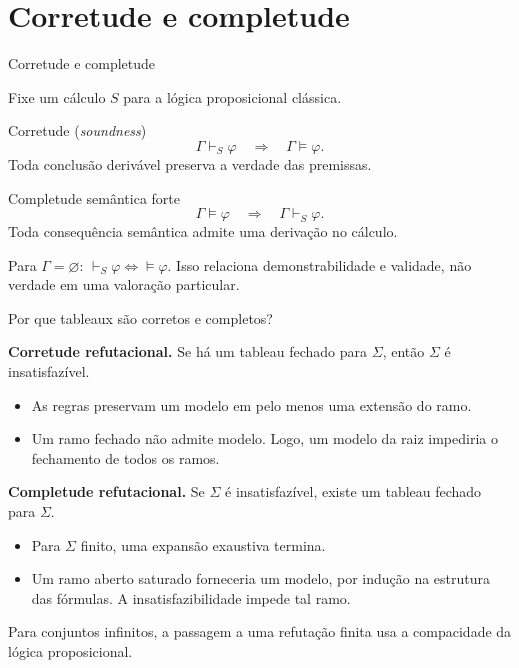\documentclass[10pt,aspectratio=169]{beamer}
\newcommand{\dest}[1]{\alert{#1}}
\begin{document}
\section{Corretude e completude}

\begin{frame}{Corretude e completude}

Fixe um cálculo $S$ para a lógica proposicional clássica.
\begin{block}{Corretude (\textit{soundness})}
\[\Gamma\vdash_S\varphi\quad\Longrightarrow\quad\Gamma\models\varphi.\]
Toda conclusão derivável preserva a verdade das premissas.
\end{block}
\begin{block}{Completude semântica forte}
\[\Gamma\models\varphi\quad\Longrightarrow\quad\Gamma\vdash_S\varphi.\]
Toda consequência semântica admite uma derivação no cálculo.
\end{block}
Para $\Gamma=\varnothing$: $\vdash_S\varphi\iff\models\varphi$.
Isso relaciona \dest{demonstrabilidade e validade}, não verdade em uma valoração particular.
\end{frame}



\begin{frame}{Por que tableaux são corretos e completos?}

\small
\textbf{Corretude refutacional.} Se há um tableau fechado para $\Sigma$, então $\Sigma$ é insatisfazível.
\begin{itemize}
\item As regras preservam um modelo em pelo menos uma extensão do ramo.
\item Um ramo fechado não admite modelo. Logo, um modelo da raiz impediria o fechamento de todos os ramos.
\end{itemize}
\textbf{Completude refutacional.} Se $\Sigma$ é insatisfazível, existe um tableau fechado para $\Sigma$.
\begin{itemize}
\item Para $\Sigma$ finito, uma expansão exaustiva termina.
\item Um ramo aberto saturado forneceria um modelo, por indução na estrutura das fórmulas. A insatisfazibilidade impede tal ramo.
\end{itemize}
Para conjuntos infinitos, a passagem a uma refutação finita usa a compacidade da lógica proposicional.
\end{frame}
\end{document}
